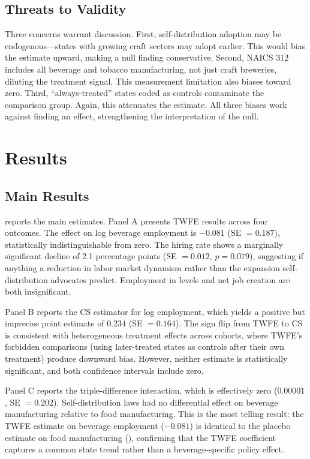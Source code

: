 \documentclass[12pt]{article}
\begin{document}
\subsection{Threats to Validity}

Three concerns warrant discussion. First, self-distribution adoption may be endogenous---states with growing craft sectors may adopt earlier. This would bias the estimate upward, making a null finding conservative. Second, NAICS 312 includes all beverage and tobacco manufacturing, not just craft breweries, diluting the treatment signal. This measurement limitation also biases toward zero. Third, ``always-treated'' states coded as controls contaminate the comparison group. Again, this attenuates the estimate. All three biases work against finding an effect, strengthening the interpretation of the null.

\section{Results}

\subsection{Main Results}



 reports the main estimates. Panel A presents TWFE results across four outcomes. The effect on log beverage employment is $-0.081$ (SE $= 0.187$), statistically indistinguishable from zero. The hiring rate shows a marginally significant decline of 2.1 percentage points (SE $= 0.012$, $p = 0.079$), suggesting if anything a reduction in labor market dynamism rather than the expansion self-distribution advocates predict. Employment in levels and net job creation are both insignificant.

Panel B reports the CS estimator for log employment, which yields a positive but imprecise point estimate of $0.234$ (SE $= 0.164$). The sign flip from TWFE to CS is consistent with heterogeneous treatment effects across cohorts, where TWFE's forbidden comparisons (using later-treated states as controls after their own treatment) produce downward bias. However, neither estimate is statistically significant, and both confidence intervals include zero.

Panel C reports the triple-difference interaction, which is effectively zero ($0.00001$, SE $= 0.202$). Self-distribution laws had no differential effect on beverage manufacturing relative to food manufacturing. This is the most telling result: the TWFE estimate on beverage employment ($-0.081$) is identical to the placebo estimate on food manufacturing (), confirming that the TWFE coefficient captures a common state trend rather than a beverage-specific policy effect.
\end{document}
